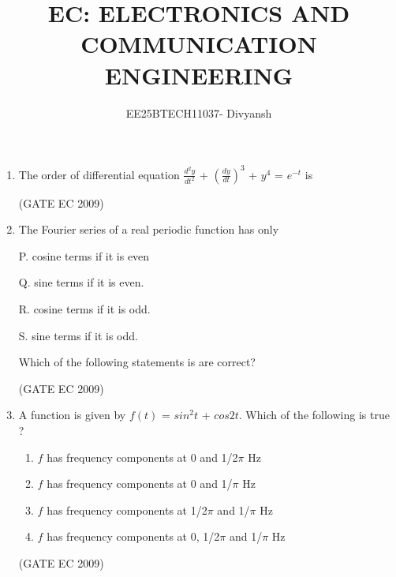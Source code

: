 \documentclass[journal,12pt,onecolumn]{IEEEtran}
\title{EC: ELECTRONICS AND COMMUNICATION ENGINEERING}
\author{EE25BTECH11037- Divyansh}
\theoremstyle{remark}
\begin{document}
\maketitle

\begin{enumerate}[start=1, label={Q\arabic*.}]

\item The order of differential equation  $\frac{d^2y}{dt^2}$ + $(\frac{dy}{dt})^3$ + $y^4$ = $e^{-t}$ is
\begin{enumerate}[label=(\Alph*)]
\end{enumerate}
\hfill (GATE EC 2009)
\item The Fourier series of a real periodic function has only 

P. \quad cosine terms if it is even

Q. \quad sine terms if it is even. 

R. \quad cosine terms if it is odd.

S. \quad sine terms if it is odd.

Which of the following statements is are correct?

\begin{enumerate}[label=(\Alph*)]
\end{enumerate}
\hfill (GATE EC 2009)

\item A function is given by $f(t)$ = $sin^2t$ + $cos2t$. Which of the following is true ?

\begin{enumerate}[label=(\Alph*)]
    \item $f$ has frequency components at 0 and 1/2$\pi$ Hz 
    \item $f$ has frequency components at 0 and 1/$\pi$ Hz 
    \item $f$ has frequency components at 1/2$\pi$ and 1/$\pi$ Hz 
    \item $f$ has frequency components at 0, 1/2$\pi$ and 1/$\pi$ Hz 
\end{enumerate}
\hfill (GATE EC 2009)


\end{enumerate}
\end{document}
